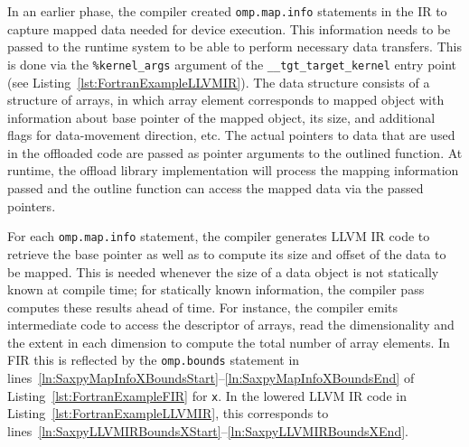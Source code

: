 \documentclass[acmtog,natbib=false]{acmart}
\newcommand{\code}[1]{\texttt{#1}\xspace}
\begin{document}

In an earlier phase, the compiler created \code{omp.map.info} statements in the \ac{IR} to capture mapped data needed for device execution.
This information needs to be passed to the runtime system to be able to perform necessary data transfers.
This is done via the \code{\%kernel\_args} argument of the \code{\_\_tgt\_target\_kernel} entry point (see Listing~\ref{lst:FortranExampleLLVMIR}).
The data structure consists of a structure of arrays, in which array element corresponds to mapped object with information about base pointer of the mapped object, its size, and additional flags for data-movement direction, etc.
The actual pointers to data that are used in the offloaded code are passed as pointer arguments to the outlined function.
At runtime, the offload library implementation will process the mapping information passed and the outline function can access the mapped data via the passed pointers.



For each \code{omp.map.info} statement, the compiler generates LLVM \ac{IR} code to retrieve the base pointer as well as to compute its size and offset of the data to be mapped.
This is needed whenever the size of a data object is not statically known at compile time; for statically known information, the compiler pass computes these results ahead of time.
For instance, the compiler emits intermediate code to access the descriptor of arrays, read the dimensionality and the extent in each dimension to compute the total number of array elements.
In \ac{FIR} this is reflected by the \code{omp.bounds} statement in lines~\ref{ln:SaxpyMapInfoXBoundsStart}--\ref{ln:SaxpyMapInfoXBoundsEnd} of Listing~\ref{lst:FortranExampleFIR} for \code{x}.
In the lowered LLVM \ac{IR} code in Listing~\ref{lst:FortranExampleLLVMIR}, this corresponds to lines~\ref{ln:SaxpyLLVMIRBoundsXStart}--\ref{ln:SaxpyLLVMIRBoundsXEnd}.
\end{document}
